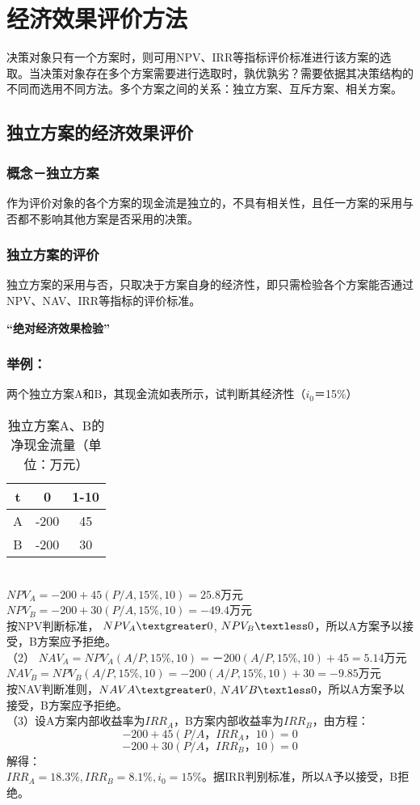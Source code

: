 \chapter{经济效果评价方法}
决策对象只有一个方案时，则可用NPV、IRR等指标评价标准进行该方案的选取。当决策对象存在多个方案需要进行选取时，孰优孰劣？需要依据其决策结构的不同而选用不同方法。多个方案之间的关系：独立方案、互斥方案、相关方案。

\section{独立方案的经济效果评价}
\subsection{概念－独立方案}
作为评价对象的各个方案的现金流是独立的，不具有相关性，且任一方案的采用与否都不影响其他方案是否采用的决策。

\subsection{独立方案的评价}
独立方案的采用与否，只取决于方案自身的经济性，即只需检验各个方案能否通过NPV、NAV、IRR等指标的评价标准。

\textbf{“绝对经济效果检验”}

\subsection{举例：}两个独立方案A和B，其现金流如表所示，试判断其经济性（$i_0$＝15\%）

\begin{table}[H]
\centering
\begin{tabular}{|c|c|c|}
\hline
t   & 0 & 1-10  \\ \hline
A   & -200 & 45 \\ \hline
B   & -200 & 30 \\ \hline
\end{tabular}
\caption{独立方案A、B的净现金流量（单位：万元）}
\end{table}
\\
$NPV_A=-200+45(P/A,15\%,10)=25.8$万元\\
$NPV_B=-200+30(P/A,15\%,10)=-49.4$万元\\
按NPV判断标准， $NPV_A  \textgreater 0$, $NPV_B \textless 0$，所以A方案予以接受，B方案应予拒绝。\\
（2） $NAV_A= NPV_A(A/P,15\%,10)=－200(A/P,15\%,10)+45=5.14$万元\\
$NAV_B= NPV_B(A/P,15\%,10)=-200(A/P,15\%,10)+30=-9.85$万元\\
按NAV判断准则，$NAVA \textgreater 0$, $NAVB \textless 0$，所以A方案予以接受，B方案应予拒绝。\\
（3）设A方案内部收益率为$IRR_A$，B方案内部收益率为$IRR_B$，由方程：\\
$$-200+45(P/A，IRR_A，10)=0$$
$$-200+30(P/A，IRR_B，10)=0$$
\noindent 解得：\\
$IRR_A=18.3\%,IRR_B=8.1\%,i_0=15\%$。据IRR判别标准，所以A予以接受，B拒绝。

